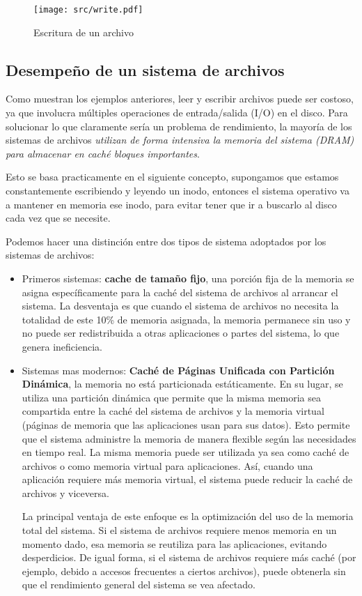 \documentclass[openany]{book}
\begin{document}
\begin{figure}[h]
    \centering
    \texttt{[image: src/write.pdf]}
    \caption{Escritura de un archivo}
\end{figure}

\subsection{Desempeño de un sistema de archivos}

Como muestran los ejemplos anteriores, leer y escribir archivos puede ser \colorbox{green!20}{costoso}, ya que involucra \colorbox{green!20}{múltiples} \colorbox{green!20}{operaciones} de entrada/salida (I/O) en el disco. Para solucionar lo que claramente sería un problema de rendimiento, la mayoría de los sistemas de archivos \textit{utilizan de forma intensiva la memoria del sistema (DRAM) para almacenar en caché bloques importantes}. 

Esto se basa practicamente en el siguiente concepto, supongamos que estamos constantemente escribiendo y leyendo un inodo, entonces el sistema operativo va a mantener en memoria ese inodo, para evitar tener que ir a buscarlo al disco cada vez que se necesite.

Podemos hacer una distinción entre dos tipos de sistema adoptados por los sistemas de archivos:
\begin{itemize}
    \item Primeros sistemas: \textbf{cache de tamaño fijo}, una porción fija de la memoria se asigna específicamente para la caché del sistema de archivos al arrancar el sistema. La desventaja es que cuando el sistema de archivos no necesita la totalidad de este 10\% de memoria asignada, la memoria permanece sin uso y no puede ser redistribuida a otras aplicaciones o partes del sistema, lo que genera ineficiencia.
    \item Sistemas mas modernos: \textbf{Caché de Páginas Unificada con Partición Dinámica}, la memoria no está particionada estáticamente. En su lugar, se utiliza una partición dinámica que permite que la misma memoria sea compartida entre la caché del sistema de archivos y la memoria virtual (páginas de memoria que las aplicaciones usan para sus datos). Esto permite que el sistema administre la memoria de manera flexible según las necesidades en tiempo real. La misma memoria puede ser utilizada ya sea como caché de archivos o como memoria virtual para aplicaciones. Así, cuando una aplicación requiere más memoria virtual, el sistema puede reducir la caché de archivos y viceversa.
    
    La principal ventaja de este enfoque es la optimización del uso de la memoria total del sistema. Si el sistema de archivos requiere menos memoria en un momento dado, esa memoria se reutiliza para las aplicaciones, evitando desperdicios. De igual forma, si el sistema de archivos requiere más caché (por ejemplo, debido a accesos frecuentes a ciertos archivos), puede obtenerla sin que el rendimiento general del sistema se vea afectado.
\end{itemize}
\end{document}
